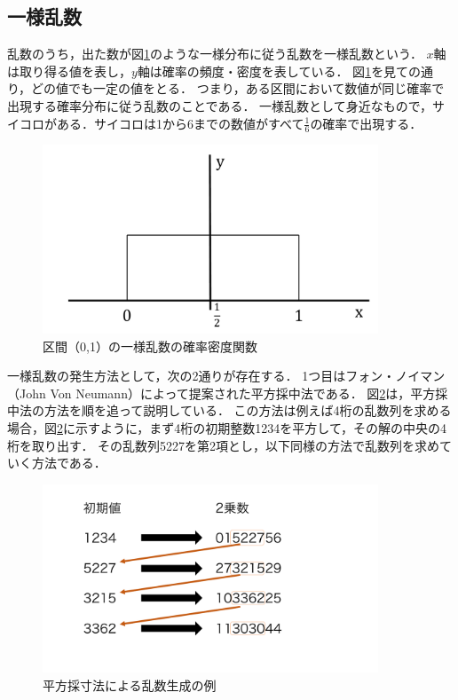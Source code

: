 \documentclass[12pt,a4j]{ltjsarticle}
\begin{document}
\subsection{一様乱数}
乱数のうち，出た数が図\ref{fig:一様乱数のグラフ}のような一様分布に従う乱数を一様乱数という．
$x$軸は取り得る値を表し，$y$軸は確率の頻度・密度を表している．
図\ref{fig:一様乱数のグラフ}を見ての通り，どの値でも一定の値をとる．
つまり，ある区間において数値が同じ確率で出現する確率分布に従う乱数のことである．
一様乱数として身近なもので，サイコロがある．サイコロは1から6までの数値がすべて$\frac{1}{6}$の確率で出現する．
\vspace{10mm}
\begin{figure}[h]
\begin{center}
\includegraphics[width = 100mm ] {figures/itiyo.pdf}
\caption{区間（0,1）の一様乱数の確率密度関数}
\label{fig:一様乱数のグラフ}
\end{center}
\end{figure}
\clearpage

一様乱数の発生方法として，次の2通りが存在する．
1つ目はフォン・ノイマン（John Von Neumann）によって提案された平方採中法である．
図\ref{fig:平方}は，平方採中法の方法を順を追って説明している．
この方法は例えば4桁の乱数列を求める場合，図\ref{fig:平方}に示すように，まず4桁の初期整数1234を平方して，その解の中央の4桁を取り出す．
その乱数列5227を第2項とし，以下同様の方法で乱数列を求めていく方法である．
\begin{figure}[h]
\begin{center}
\includegraphics[width = 100mm ] {figures/heihousaisunhou.pdf}
\caption{平方採寸法による乱数生成の例} 
\label{fig:平方}
\end{center}
\end{figure}
\end{document}
